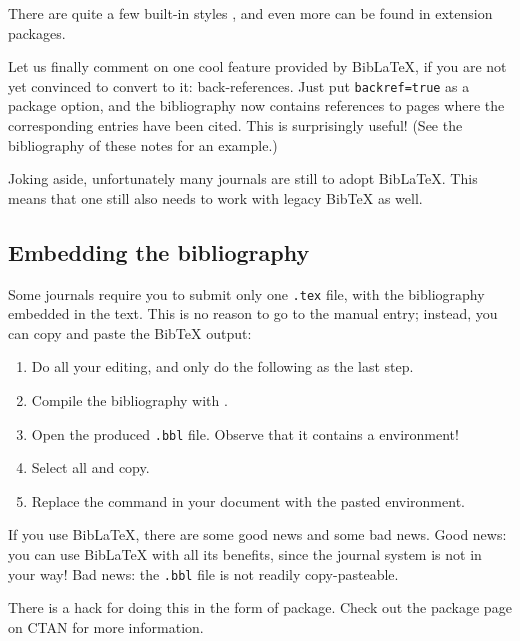 There are quite a few built-in styles \cite[Section~3.3]{biblatex},
and even more can be found in extension packages.

Let us finally comment on one cool feature provided by BibLaTeX,
if you are not yet convinced to convert to it: back-references.
Just put \verb|backref=true| as a package option,
and the bibliography now contains references to pages where the corresponding entries have been cited.
This is surprisingly useful!
(See the bibliography of these notes for an example.)

\begin{practices}
Joking aside, unfortunately many journals are still to adopt BibLaTeX.
This means that one still also needs to work with legacy BibTeX as well.
\end{practices}


%
\subsection{Embedding the bibliography}

Some journals require you to submit only one \verb|.tex| file,
with the bibliography embedded in the text.
This is no reason to go to the manual entry;
instead, you can copy and paste the BibTeX output:

\begin{enumerate}
\addtocounter{enumi}{-1}
\item Do all your editing, and only do the following as the last step.
\item Compile the bibliography with .
\item Open the produced \verb|.bbl| file.
    Observe that it contains a  environment!
\item Select all and copy.
\item Replace the \verb|| command in your document
    with the pasted environment.
\end{enumerate}

If you use BibLaTeX, there are some good news and some bad news.
Good news: you can use BibLaTeX with all its benefits,
since the journal system is not in your way!
Bad news: the \verb|.bbl| file is not readily copy-pasteable.

There is a hack for doing this in the form of  package.
Check out the package page on CTAN for more information.





